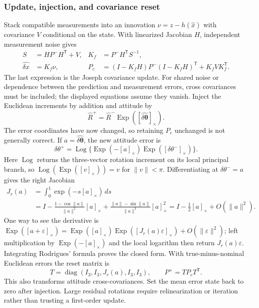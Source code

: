\subsubsection{Update, injection, and covariance reset}

Stack compatible measurements into an innovation $\nu=z-h(\widehat x)$
with covariance $V$ conditional on the state. With linearized Jacobian
$H$, independent measurement noise gives
\begin{align}
 S&=HP^-H^{\mathsf T}+V,&K_f&=P^-H^{\mathsf T}S^{-1},\\
 \widehat{\delta x}&=K_f\nu,&
 P_c&=(I-K_fH)P^-(I-K_fH)^{\mathsf T}+K_fVK_f^{\mathsf T}.
\end{align}
The last expression is the Joseph covariance update. For shared noise
or dependence between the prediction and measurement errors, cross
covariances must be included; the displayed equations assume they vanish.
Inject the Euclidean increments by addition and attitude by
\begin{equation}
 \widehat R^+=\widehat R^-\operatorname{Exp}
                     ([\widehat{\delta\boldsymbol\theta}]_\times).
\end{equation}
The error coordinates have now changed, so retaining $P_c$ unchanged is
not generally correct. If $a=\widehat{\delta\boldsymbol\theta}$, the new
attitude error is
\begin{equation}
 \delta\theta^+=\operatorname{Log}\{\operatorname{Exp}(-[a]_\times)
                                \operatorname{Exp}([\delta\theta^-]_\times)\}.
\end{equation}
Here $\operatorname{Log}$ returns the three-vector rotation increment
on its local principal branch, so
$\operatorname{Log}(\operatorname{Exp}([v]_\times))=v$ for
$\|v\|<\pi$. Differentiating at $\delta\theta^-=a$ gives the right Jacobian
\begin{align}
 J_r(a)&=\int_0^1\exp(-s[a]_\times)\,ds\\
 &=I-\frac{1-\cos\|a\|}{\|a\|^2}[a]_\times
       +\frac{\|a\|-\sin\|a\|}{\|a\|^3}[a]_\times^2
   =I-\tfrac12[a]_\times+O(\|a\|^2).
\end{align}
One way to see the derivative is
$\operatorname{Exp}([a+\varepsilon]_\times)
=\operatorname{Exp}([a]_\times)\operatorname{Exp}([J_r(a)\varepsilon]_\times)
+O(\|\varepsilon\|^2)$; left multiplication by
$\operatorname{Exp}(-[a]_\times)$ and the local logarithm then return
$J_r(a)\varepsilon$. Integrating Rodrigues' formula proves the closed
form. With true-minus-nominal Euclidean errors the reset matrix is
\begin{equation}
 T=\operatorname{diag}(I_3,I_3,J_r(a),I_3,I_3),\qquad
 P^+=T P_cT^{\mathsf T}.
\end{equation}
This also transforms attitude cross-covariances. Set the mean error
state back to zero after injection. Large residual rotations require
relinearization or iteration rather than trusting a first-order update.

